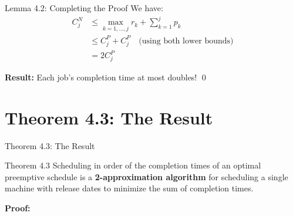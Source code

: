 \documentclass[aspectratio=169, 12pt]{beamer}
\begin{document}
\begin{frame}{Lemma 4.2: Completing the Proof}
    We have:
    \begin{align*}
        C_j^N &\leq \max_{k=1,\ldots,j} r_k + \sum_{k=1}^{j} p_k \\
        &\leq C_j^P + C_j^P \quad \text{(using both lower bounds)} \\
        &= 2C_j^P
    \end{align*}

    \vspace{0.5cm}
    \begin{center}
    \end{center}
    \textbf{Result:} Each job's completion time at most doubles! \qed
\end{frame}

\section{Theorem 4.3: The Result}

\begin{frame}{Theorem 4.3: The Result}
    \begin{block}{Theorem 4.3}
        Scheduling in order of the completion times of an optimal preemptive schedule is a \textbf{2-approximation algorithm} for scheduling a single machine with release dates to minimize the sum of completion times.
    \end{block}

    \vspace{0.5cm}
    \textbf{Proof:}

    \vspace{0.3cm}
\end{frame}
\end{document}
